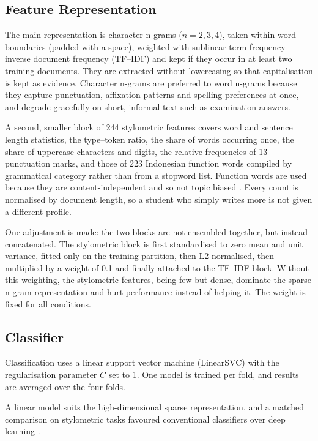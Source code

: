 \documentclass[runningheads]{llncs}
\begin{document}
\subsection{Feature Representation}
\label{sec:features}

The main representation is character n-grams ($n = 2, 3, 4$), taken within word boundaries (padded with a space), weighted with sublinear term frequency--inverse document frequency (TF--IDF) and kept if they occur in at least two training documents. They are extracted without lowercasing so that capitalisation is kept as evidence. Character n-grams are preferred to word n-grams because they capture punctuation, affixation patterns and spelling preferences at once, and degrade gracefully on short, informal text such as examination answers.

A second, smaller block of 244 stylometric features covers word and sentence length statistics, the type--token ratio, the share of words occurring once, the share of uppercase characters and digits, the relative frequencies of 13 punctuation marks, and those of 223 Indonesian function words compiled by grammatical category rather than from a stopword list. Function words are used because they are content-independent and so not topic biased \cite{He2024}. Every count is normalised by document length, so a student who simply writes more is not given a different profile.

One adjustment is made: the two blocks are not ensembled together, but instead concatenated. The stylometric block is first standardised to zero mean and unit variance, fitted only on the training partition, then L2 normalised, then multiplied by a weight of 0.1 and finally attached to the TF--IDF block. Without this weighting, the stylometric features, being few but dense, dominate the sparse n-gram representation and hurt performance instead of helping it. The weight is fixed for all conditions.

\subsection{Classifier}

Classification uses a linear support vector machine (LinearSVC) with the regularisation parameter $C$ set to 1. One model is trained per fold, and results are averaged over the four folds.

A linear model suits the high-dimensional sparse representation, and a matched comparison on stylometric tasks favoured conventional classifiers over deep learning \cite{Sayoud2025}.
\end{document}
